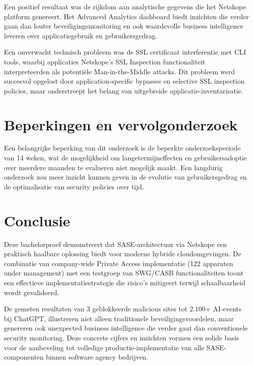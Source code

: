 \vspace{2ex}

Een positief resultaat was de rijkdom aan analytische gegevens die het Netskope platform genereert. Het Advanced Analytics dashboard biedt inzichten die verder gaan dan louter beveiligingsmonitoring en ook waardevolle business intelligence leveren over applicatiegebruik en gebruikersgedrag.

\vspace{2ex}

Een onverwacht technisch probleem was de SSL certificaat interferentie met CLI tools, waarbij applicaties Netskope's SSL Inspection functionaliteit interpreteerden als potentiële Man-in-the-Middle attacks. Dit probleem werd succesvol opgelost door application-specific bypasses en selective SSL inspection policies, maar onderstreept het belang van uitgebreide applicatie-inventarisatie.

\section{Beperkingen en vervolgonderzoek}

Een belangrijke beperking van dit onderzoek is de beperkte onderzoeksperiode van 14 weken, wat de mogelijkheid om langetermijneffecten en gebruikersadoptie over meerdere maanden te evalueren niet mogelijk maakt. Een langdurig onderzoek zou meer inzicht kunnen geven in de evolutie van gebruikersgedrag en de optimalisatie van security policies over tijd.

\section{Conclusie}

Deze bachelorproef demonstreert dat SASE-architectuur via Netskope een praktisch haalbare oplossing biedt voor moderne hybride cloudomgevingen. De combinatie van company-wide Private Access implementatie (122 apparaten under management) met een testgroep van SWG/CASB functionaliteiten toont een effectieve implementatiestrategie die risico's mitigeert terwijl schaalbaarheid wordt gevalideerd.

\vspace{2ex}

De gemeten resultaten van 3 geblokkeerde malicious sites tot 2.100+ AI-events bij ChatGPT, illustreren niet alleen traditionele beveiligingsvoordelen, maar genereren ook unexpected business intelligence die verder gaat dan conventionele security monitoring. Deze concrete cijfers en inzichten vormen een solide basis voor de aanbeveling tot volledige productie-implementatie van alle SASE-componenten binnen software agency bedrijven.

